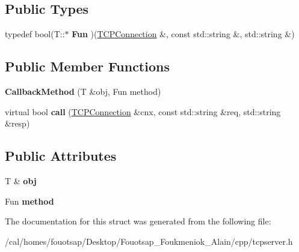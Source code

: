 \subsection*{Public Types}
\begin{DoxyCompactItemize}
\item 
\hypertarget{structcppu_1_1_t_c_p_server_1_1_callback_method_a2911cc72786a989aa57c660248ffb44c}{typedef bool(T\+::$\ast$ {\bfseries Fun} )(\hyperlink{classcppu_1_1_t_c_p_connection}{T\+C\+P\+Connection} \&, const std\+::string \&, std\+::string \&)}\label{structcppu_1_1_t_c_p_server_1_1_callback_method_a2911cc72786a989aa57c660248ffb44c}

\end{DoxyCompactItemize}
\subsection*{Public Member Functions}
\begin{DoxyCompactItemize}
\item 
\hypertarget{structcppu_1_1_t_c_p_server_1_1_callback_method_a0c6ceee6db8c67ef56fb26d1df52140f}{{\bfseries Callback\+Method} (T \&obj, Fun method)}\label{structcppu_1_1_t_c_p_server_1_1_callback_method_a0c6ceee6db8c67ef56fb26d1df52140f}

\item 
\hypertarget{structcppu_1_1_t_c_p_server_1_1_callback_method_a0c11039d0ed983c03a614d0764df3793}{virtual bool {\bfseries call} (\hyperlink{classcppu_1_1_t_c_p_connection}{T\+C\+P\+Connection} \&cnx, const std\+::string \&req, std\+::string \&resp)}\label{structcppu_1_1_t_c_p_server_1_1_callback_method_a0c11039d0ed983c03a614d0764df3793}

\end{DoxyCompactItemize}
\subsection*{Public Attributes}
\begin{DoxyCompactItemize}
\item 
\hypertarget{structcppu_1_1_t_c_p_server_1_1_callback_method_ae480535d346efc119fb5c43880f349c8}{T \& {\bfseries obj}}\label{structcppu_1_1_t_c_p_server_1_1_callback_method_ae480535d346efc119fb5c43880f349c8}

\item 
\hypertarget{structcppu_1_1_t_c_p_server_1_1_callback_method_aab858a039ddee71fb65a0e35c173f067}{Fun {\bfseries method}}\label{structcppu_1_1_t_c_p_server_1_1_callback_method_aab858a039ddee71fb65a0e35c173f067}

\end{DoxyCompactItemize}


The documentation for this struct was generated from the following file\+:\begin{DoxyCompactItemize}
\item 
/cal/homes/fouotsap/\+Desktop/\+Fouotsap\+\_\+\+Foukmeniok\+\_\+\+Alain/cpp/tcpserver.\+h\end{DoxyCompactItemize}
